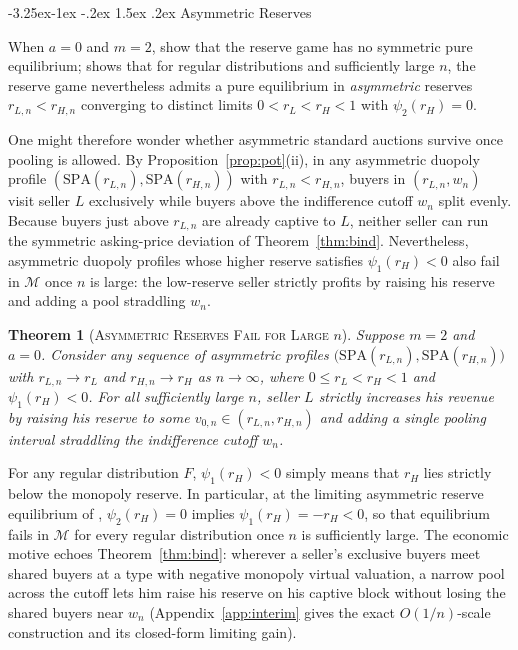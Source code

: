 \documentclass[12pt]{article}
\makeatletter
\newcommand{\citeasnoun}[1]{\citet{#1}}
\theoremstyle{mystyle}
\newtheorem{theorem}{Theorem}
\theoremstyle{mystyle2}
\newcommand{\mmpfont}{\scshape}
\renewcommand\subsection{\@startsection{subsection}{2}{\z@}%
                                     {-3.25ex\@plus -1ex \@minus -.2ex}%
                                     {1.5ex \@plus .2ex}%
                                     {\normalfont\normalsize\mmpfont}}
\newcommand{\M}{\mathcal{M}}
\newcommand{\SPA}{\mathrm{SPA}}
\newcommand{\1}{\mathbf{1}}
\makeatother
\begin{document}
\subsection{Asymmetric Reserves}

When $a=0$ and $m=2$, \citeasnoun{burguet} show that the reserve game has no symmetric pure equilibrium; \citeasnoun{he2026} shows that for regular distributions and sufficiently large $n$, the reserve game nevertheless admits a pure equilibrium in \emph{asymmetric} reserves $r_{L,n}<r_{H,n}$ converging to distinct limits $0<r_L<r_H<1$ with $\psi_2(r_H)=0$.

One might therefore wonder whether asymmetric standard auctions survive once pooling is allowed. By Proposition~\ref{prop:pot}(ii), in any asymmetric duopoly profile $(\SPA(r_{L,n}),\SPA(r_{H,n}))$ with $r_{L,n}<r_{H,n}$, buyers in $(r_{L,n},w_n)$ visit seller $L$ exclusively while buyers above the indifference cutoff $w_n$ split evenly. Because buyers just above $r_{L,n}$ are already captive to $L$, neither seller can run the symmetric asking-price deviation of Theorem~\ref{thm:bind}. Nevertheless, asymmetric duopoly profiles whose higher reserve satisfies $\psi_1(r_H)<0$ also fail in $\M$ once $n$ is large: the low-reserve seller strictly profits by raising his reserve and adding a pool straddling $w_n$.

\begin{theorem}[\textsc{Asymmetric Reserves Fail for Large $n$}]\label{thm:asym}
Suppose $m=2$ and $a=0$. Consider any sequence of asymmetric profiles $\bigl(\SPA(r_{L,n}),\SPA(r_{H,n})\bigr)$ with $r_{L,n}\to r_L$ and $r_{H,n}\to r_H$ as $n\to\infty$, where $0\le r_L<r_H<1$ and $\psi_1(r_H)<0$. For all sufficiently large $n$, seller $L$ strictly increases his revenue by raising his reserve to some $v_{0,n}\in(r_{L,n},r_{H,n})$ and adding a single pooling interval straddling the indifference cutoff $w_n$.
\end{theorem}

For any regular distribution $F$, $\psi_1(r_H)<0$ simply means that $r_H$ lies strictly below the monopoly reserve. In particular, at the limiting asymmetric reserve equilibrium of \citeasnoun{he2026}, $\psi_2(r_H)=0$ implies $\psi_1(r_H)=-r_H<0$, so that equilibrium fails in $\M$ for every regular distribution once $n$ is sufficiently large. The economic motive echoes Theorem~\ref{thm:bind}: wherever a seller's exclusive buyers meet shared buyers at a type with negative monopoly virtual valuation, a narrow pool across the cutoff lets him raise his reserve on his captive block without losing the shared buyers near $w_n$ (Appendix~\ref{app:interim} gives the exact $O(1/n)$-scale construction and its closed-form limiting gain).
\end{document}
